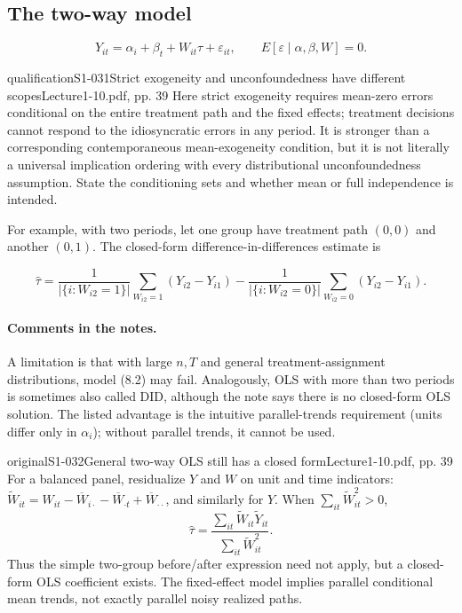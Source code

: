\subsection{The two-way model}
\[
Y_{it}=\alpha_i+\beta_t+W_{it}\tau+\varepsilon_{it},
\qquad E[\varepsilon\mid\alpha,\beta,W]=0.
\tag{8.2 in the notes}
\]
 
\begin{reviewnote}{qualification}{S1-031}{Strict exogeneity and unconfoundedness have different scopes}{Lecture1-10.pdf, pp. 39}
Here strict exogeneity requires mean-zero errors conditional on the entire treatment path and the fixed effects; treatment decisions cannot respond to the idiosyncratic errors in any period. It is stronger than a corresponding contemporaneous mean-exogeneity condition, but it is not literally a universal implication ordering with every distributional unconfoundedness assumption. State the conditioning sets and whether mean or full independence is intended.
\end{reviewnote}
 For example, with two periods, let one group have treatment path $(0,0)$ and another $(0,1)$. The closed-form difference-in-differences estimate is

\[
\widehat\tau=\frac1{|\{i:W_{i2}=1\}|}\sum_{W_{i2}=1}(Y_{i2}-Y_{i1})
-\frac1{|\{i:W_{i2}=0\}|}\sum_{W_{i2}=0}(Y_{i2}-Y_{i1}).
\]
\paragraph{Comments in the notes.}
A limitation is that with large $n,T$ and general treatment-assignment distributions, model (8.2) may fail. Analogously, OLS with more than two periods is sometimes also called DID, although the note says there is no closed-form OLS solution. The listed advantage is the intuitive parallel-trends requirement (units differ only in $\alpha_i$); without parallel trends, it cannot be used.
\begin{reviewnote}{original}{S1-032}{General two-way OLS still has a closed form}{Lecture1-10.pdf, pp. 39}
For a balanced panel, residualize $Y$ and $W$ on unit and time indicators: $\widetilde W_{it}=W_{it}-\overline W_{i\cdot}-\overline W_{\cdot t}+\overline W_{\cdot\cdot}$, and similarly for $Y$. When $\sum_{it}\widetilde W_{it}^2>0$,
\[
\widehat\tau=\frac{\sum_{it}\widetilde W_{it}\widetilde Y_{it}}{\sum_{it}\widetilde W_{it}^2}.
\]
Thus the simple two-group before/after expression need not apply, but a closed-form OLS coefficient exists. The fixed-effect model implies parallel conditional mean trends, not exactly parallel noisy realized paths.
\end{reviewnote}


